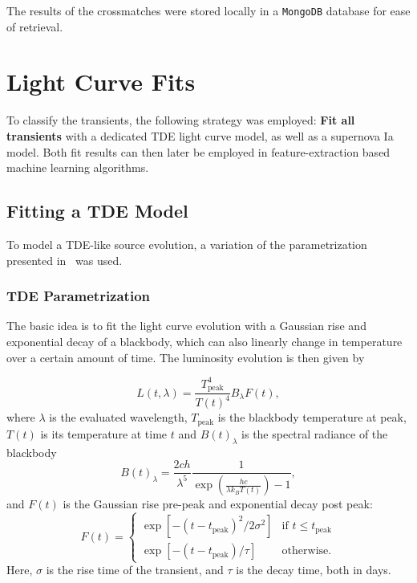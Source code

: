 The results of the crossmatches were stored locally in a \texttt{MongoDB} database for ease of retrieval.

\section{Light Curve Fits}
To classify the transients, the following strategy was employed: \textbf{Fit all transients} with a dedicated TDE light curve model, as well as a supernova Ia model. Both fit results can then later be employed in feature-extraction based machine learning algorithms.

\subsection{Fitting a TDE Model}
To model a TDE-like source evolution, a variation of the parametrization presented in~\cite{Velzen2021a} was used.

\subsubsection{TDE Parametrization}
The basic  idea is to fit the light curve evolution with a Gaussian rise and exponential decay of a blackbody, which can also linearly change in temperature over a certain amount of time. The luminosity evolution is then given by

\begin{equation}
    L(t,\lambda) = \frac{T_\text{peak}^4}{T(t)^4} B_\lambda F(t),
\end{equation}
where $\lambda$ is the evaluated wavelength, $T_\text{peak}$ is the blackbody temperature at peak, $T(t)$ is its temperature at time $t$ and $B(t)_\lambda$ is the spectral radiance of the blackbody
\begin{equation}
    B(t)_\lambda = \frac{2 c h}{\lambda^5} \frac{1}{\exp(\frac{hc}{\lambda k_B T(t)})-1},
\end{equation}
and $F(t)$ is the Gaussian rise pre-peak and exponential decay post peak:
\begin{equation}
    F(t) = \begin{cases}
        \exp[-(t-t_\text{peak})^2/2\sigma^2] & \text{if } t\leq t_\text{peak} \\
        \exp[-(t-t_\text{peak})/\tau]        & \text{otherwise.}
    \end{cases}
\end{equation}
Here, $\sigma$ is the rise time of the transient, and $\tau$ is the decay time, both in days.

